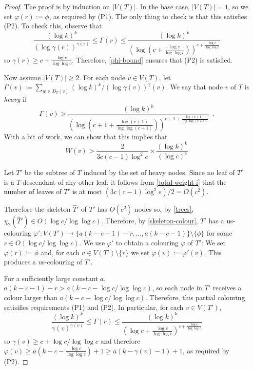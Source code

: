 \documentclass[kpfonts]{patmorin}
\newcommand{\uqs}{\chi_2}
\begin{document}
\begin{proof}
    The proof is by induction on $|V(T)|$.  In the base case, $|V(T)|=1$, so we set $\varphi(r):=\phi$, as required by (P1). The only thing to check is that this satisfies (P2). To check this, observe that
    \[ \frac{(\log k)^k}{(\log\gamma(r))^{\gamma(r)}}\le \Gamma(r) \le \frac{(\log k)^k}{\left(\log \left(c+\tfrac{\log c}{\log\log c}\right)\right)^{c+\tfrac{\log c}{\log\log c}}}
    \]
    so $\gamma(r) \ge c+\tfrac{\log c}{\log\log c}$. Therefore, \cref{phi-bound} ensures that (P2) is satisfied.

    Now assume $|V(T)|\ge 2$.  For each node $v\in V(T)$, let $\Gamma(v):=\sum_{w\in D_T(v)} (\log k)^k/(\log\gamma(v))^\gamma(v)$.  We say that node $v$ of $T$ is \emph{heavy} if
    \[
        \Gamma(v)> \frac{(\log k)^k}{\left(\log\left(c+1+\tfrac{\log (c+1)}{\log\log (c+1)}\right)\right)^{c+1+\tfrac{\log (c+1)}{\log\log(c+1)}}} \enspace .
    \]
    With a bit of work, we can show that this implies that
    \[
        W(v) > \frac{2}{3c(c-1)\log^2 e}\times \frac{(\log k)^k}{(\log c)^c}
    \]

    Let $T'$ be the subtree of $T$ induced by the set of heavy nodes.  Since no leaf of $T'$ is a $T$-descendant of any other leaf, it follows from \cref{total-weight-i} that the number of leaves of $T'$ is at most $(3c(c-1)\log^2 e)/2= O(c^2)$.

    Therefore the skeleton $\hat{T}'$ of $T'$ has $O(c^2)$ nodes so, by \cref{trees}, $\uqs(\hat{T}')\in O(\log c/\log\log c)$. Therefore, by \cref{skeleton-colour}, $T'$ has a us-colouring $\varphi':V(T')\to \{a(k-c-1)-r,\ldots,a(k-c-1)\}\setminus\{\phi\}$ for some $r\in O(\log c/\log\log c)$.  We use $\varphi'$ to obtain a colouring $\varphi$ of $T'$:  We set $\varphi(r):=\phi$ and, for each $v\in V(T')\setminus\{r\}$ we set $\varphi(v):=\varphi'(v)$.  This produces a us-colouring of $T'$.

    For a sufficiently large constant $a$, $a(k-c-1)-r > a(k-c-\log c/\log\log c)$, so each node in $T'$ receives a colour larger than $a(k-c-\log c/\log\log c)$.  Therefore, this partial colouring satisifies requirements (P1) and (P2). In particular, for each $v\in V(T')$,
    \[
       \frac{(\log k)^k}{\gamma(v)^{\gamma(v)}} \le \Gamma(r) \le \frac{(\log k)^k}{\left(\log c+\tfrac{\log c}{\log\log c}\right)^{c+\tfrac{\log c}{\log\log c}}}
   \]
   so $\gamma(v) \ge c+\log c/\log\log c$ and therefore $\varphi(v) \ge a(k-c-\tfrac{\log c}{\log\log c})+1 \ge a(k-\gamma(v)-1)+1$, as required by (P2).


\end{proof}
\end{document}
